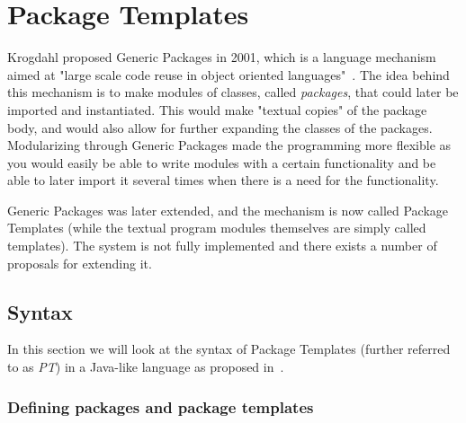 \section{Package Templates}\label{sec:package-templates}


Krogdahl proposed Generic Packages in 2001, which is a language mechanism aimed at "large scale code reuse in object oriented languages"~\cite{krogdahl:GP}.
The idea behind this mechanism is to make modules of classes, called \textit{packages}, that could later be imported and instantiated.
This would make "textual copies" of the package body, and would also allow for further expanding the classes of the packages.
Modularizing through Generic Packages made the programming more flexible as you would easily be able to write modules with a certain functionality and be able to later import it several times when there is a need for the functionality.

Generic Packages was later extended, and the mechanism is now called Package Templates (while the textual program modules themselves are simply called templates).
The system is not fully implemented and there exists a number of proposals for extending it.

\subsection{Syntax}\label{subsec:syntax}

In this section we will look at the syntax of Package Templates (further referred to as \emph{PT}) in a Java-like language as proposed in~\cite{jot}.

\subsubsection{Defining packages and package templates}

